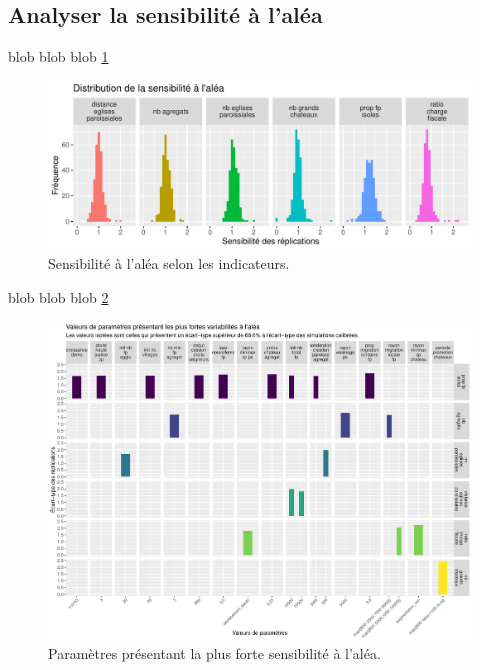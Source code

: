 \subsection{Analyser la sensibilité à l'aléa}

blob blob blob \cref{fig:histo-sensib-alea}

\begin{figure}[H]
	\centering
	\includegraphics[width=\linewidth]{img/histo_sensibilite_alea.pdf}
	\caption{Sensibilité à l'aléa selon les indicateurs.}
	\label{fig:histo-sensib-alea}
\end{figure}

blob blob blob \cref{fig:sensib-alea}

\begin{figure}[H]
	\centering
	\includegraphics[width=\linewidth]{img/sensiblite_alea.pdf}
	\caption{Paramètres présentant la plus forte sensibilité à l'aléa.}
	\label{fig:sensib-alea}
\end{figure}
